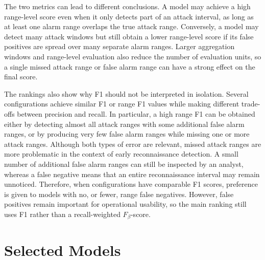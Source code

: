 The two metrics can lead to different conclusions. A model may achieve a high range-level score even when it only detects part of an attack interval, as long as at least one alarm range overlaps the true attack range. Conversely, a model may detect many attack windows but still obtain a lower range-level score if its false positives are spread over many separate alarm ranges. Larger aggregation windows and range-level evaluation also reduce the number of evaluation units, so a single missed attack range or false alarm range can have a strong effect on the final score.

The rankings also show why F1 should not be interpreted in isolation. Several configurations achieve similar F1 or range F1 values while making different trade-offs between precision and recall. In particular, a high range F1 can be obtained either by detecting almost all attack ranges with some additional false alarm ranges, or by producing very few false alarm ranges while missing one or more attack ranges. Although both types of error are relevant, missed attack ranges are more problematic in the context of early reconnaissance detection. A small number of additional false alarm ranges can still be inspected by an analyst, whereas a false negative means that an entire reconnaissance interval may remain unnoticed. Therefore, when configurations have comparable F1 scores, preference is given to models with no, or fewer, range false negatives. However, false positives remain important for operational usability, so the main ranking still uses F1 rather than a recall-weighted \(F_{\beta}\)-score.

\section{Selected Models}

